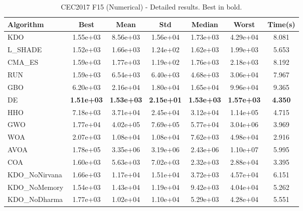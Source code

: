 \begin{table}[H]
\centering\small
\caption{CEC2017 F15 (Numerical) - Detailed results. Best in bold.}
\label{tab:cec2017_F15}
\begin{tabular}{lcccccc}
\toprule
\textbf{Algorithm} & \textbf{Best} & \textbf{Mean} & \textbf{Std} & \textbf{Median} & \textbf{Worst} & \textbf{Time(s)} \\
\midrule
KDO & 1.55e+03 & 8.56e+03 & 1.56e+04 & 1.73e+03 & 4.29e+04 & 8.081 \\
L_SHADE & 1.52e+03 & 1.66e+03 & 1.24e+02 & 1.62e+03 & 1.99e+03 & 5.653 \\
CMA_ES & 1.59e+03 & 1.77e+03 & 1.19e+02 & 1.76e+03 & 2.18e+03 & 8.192 \\
RUN & 1.59e+03 & 6.54e+03 & 6.40e+03 & 4.68e+03 & 3.06e+04 & 7.967 \\
GBO & 6.20e+03 & 2.16e+04 & 1.80e+04 & 1.65e+04 & 9.96e+04 & 9.365 \\
DE & \textbf{1.51e+03} & \textbf{1.53e+03} & \textbf{2.15e+01} & \textbf{1.53e+03} & \textbf{1.57e+03} & \textbf{4.350} \\
HHO & 7.18e+03 & 3.71e+04 & 2.45e+04 & 3.12e+04 & 1.14e+05 & 4.715 \\
GWO & 1.77e+04 & 4.02e+05 & 7.69e+05 & 5.77e+04 & 3.04e+06 & 3.969 \\
WOA & 2.07e+03 & 1.08e+04 & 1.08e+04 & 7.62e+03 & 4.98e+04 & 2.916 \\
AVOA & 1.78e+05 & 3.35e+06 & 3.19e+06 & 2.43e+06 & 1.10e+07 & 5.995 \\
COA & 1.60e+03 & 5.63e+03 & 7.02e+03 & 2.32e+03 & 2.88e+04 & 3.395 \\
KDO_NoNirvana & 1.66e+03 & 1.17e+04 & 1.51e+04 & 3.72e+03 & 4.57e+04 & 6.151 \\
KDO_NoMemory & 1.54e+03 & 1.43e+04 & 1.19e+04 & 9.42e+03 & 4.04e+04 & 5.262 \\
KDO_NoDharma & 1.77e+03 & 1.02e+04 & 1.10e+04 & 5.29e+03 & 4.28e+04 & 5.551 \\
\bottomrule
\end{tabular}
\end{table}
